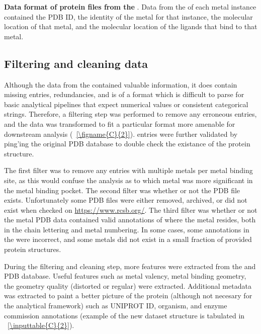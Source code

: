 \documentclass[../main/main]{subfiles}
\begin{document}
\begin{table}[H]
\footnotesize
\centering
	
	\caption[Data format of protein files from the \mPDB{}]
	{
		\textbf{Data format of protein files from the \mPDB{}}.
		Data from the \mPDB{} of each metal instance contained the PDB ID, the identity of the metal for that instance, the molecular location of that metal, and the molecular location of the ligands that bind to that metal.
	}
	\label{\inputtable{C}{1}}
\end{table}

\subsection{Filtering and cleaning data}
\label{subsection:appendixC:filter-clean}
Although the data from the \mPDB{} contained valuable information, it does contain missing entries, redundancies, and is of a format which is difficult to parse for basic analytical pipelines that expect numerical values or consistent categorical strings. Therefore, a filtering step was performed to remove any erroneous entries, and the data was transformed to fit a particular format more amenable for downstream analysis (\FIGURE~\ref{\figname{C}{2}}). \mPDB{} entries were further validated by ping'ing the original PDB database to double check the existance of the protein structure.

The first filter was to remove any entries with multiple metals per metal binding site, as this would confuse the analysis as to which metal was more significant in the metal binding pocket. The second filter was whether or not the PDB file exists. Unfortunately some PDB files were either removed, archived, or did not exist when checked on \url{https://www.rcsb.org/}. The third filter was whether or not the metal PDB data contained valid annotations of where the metal resides, both in the chain lettering and metal numbering. In some cases, some annotations in the \mPDB{} were incorrect, and some metals did not exist in a small fraction of provided protein structures.

During the filtering and cleaning step, more features were extracted from the \mPDB{} and PDB database. Useful features such as metal valency, metal binding geometry, the geometry quality (distorted or regular) were extracted. Additional metadata was extracted to paint a better picture of the protein (although not necesary for the analytical framework) such as UNIPROT ID, organism, and enzyme commission annotations (example of the new dataset structure is tabulated in \TABLE~\ref{\inputtable{C}{2}}).
\end{document}
